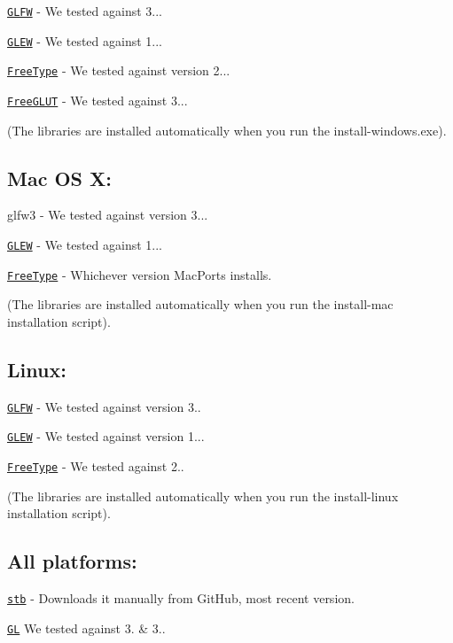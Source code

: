 \href{https://github.com/glfw/glfw/releases/download/3.1.1/glfw-3.1.1.zip}{\tt G\-L\-F\-W} -\/ We tested against 3...

\href{http://downloads.sourceforge.net/project/glew/glew/1.12.0/glew-1.12.0.zip}{\tt G\-L\-E\-W} -\/ We tested against 1...

\href{http://downloads.sourceforge.net/project/gnuwin32/freetype/2.3.5-1/freetype-2.3.5-1-bin.zip}{\tt Free\-Type} -\/ We tested against version 2...

\href{http://downloads.sourceforge.net/project/freeglut/freeglut/3.0.0/freeglut-3.0.0.tar.gz}{\tt Free\-G\-L\-U\-T} -\/ We tested against 3...

(The libraries are installed automatically when you run the install-\/windows.\-exe).

\subsection*{Mac O\-S X\-:}

glfw3 -\/ We tested against version 3...

\href{http://downloads.sourceforge.net/project/glew/glew/1.12.0/glew-1.12.0.zip}{\tt G\-L\-E\-W} -\/ We tested against 1...

\href{http://downloads.sourceforge.net/project/gnuwin32/freetype/2.3.5-1/freetype-2.3.5-1-bin.zip}{\tt Free\-Type} -\/ Whichever version Mac\-Ports installs.

(The libraries are installed automatically when you run the install-\/mac installation script).

\subsection*{Linux\-:}

\href{http://www.glfw.org/download.html}{\tt G\-L\-F\-W} -\/ We tested against version 3..

\href{http://glew.sourceforge.net/}{\tt G\-L\-E\-W} -\/ We tested against version 1...

\href{http://www.freetype.org/download.html}{\tt Free\-Type} -\/ We tested against 2..

(The libraries are installed automatically when you run the install-\/linux installation script).

\subsection*{All platforms\-:}

\href{https://github.com/nothings/stb/archive/master.zip}{\tt stb} -\/ Downloads it manually from Git\-Hub, most recent version.

\href{https://www.opengl.org/}{\tt G\-L} We tested against 3. \& 3.. 
